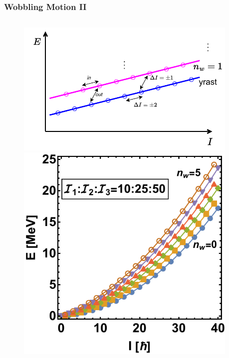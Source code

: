 \documentclass{beamer}
\begin{document}
\begin{frame}
	\frametitle{Wobbling Motion II}
	\vspace{-0.4cm}
	\begin{columns}
		\begin{column}{0.6\textwidth}
			\begin{figure}
				\centering
				\includegraphics[scale=0.45]{figures/wobbling_n_schematic.drawio.pdf}
				\includegraphics[scale=0.48]{figures/wobblingFreq-evenA.pdf}
			\end{figure}
		\end{column}
		\begin{column}{0.4\textwidth}

\end{column}
\end{columns}
\end{frame}
\end{document}
